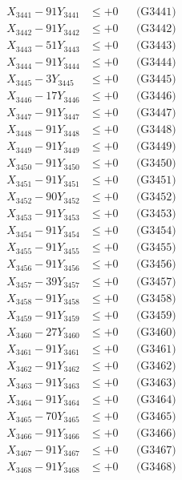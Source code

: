 \documentclass[a4paper,10pt]{article}
\begin{document}
{\begin{align}
\allowbreak
X_{3441} - 91Y_{3441} &\leq +0 && \text{(G3441)} \\
X_{3442} - 91Y_{3442} &\leq +0 && \text{(G3442)} \\
X_{3443} - 51Y_{3443} &\leq +0 && \text{(G3443)} \\
X_{3444} - 91Y_{3444} &\leq +0 && \text{(G3444)} \\
X_{3445} - 3Y_{3445} &\leq +0 && \text{(G3445)} \\
X_{3446} - 17Y_{3446} &\leq +0 && \text{(G3446)} \\
X_{3447} - 91Y_{3447} &\leq +0 && \text{(G3447)} \\
X_{3448} - 91Y_{3448} &\leq +0 && \text{(G3448)} \\
X_{3449} - 91Y_{3449} &\leq +0 && \text{(G3449)} \\
X_{3450} - 91Y_{3450} &\leq +0 && \text{(G3450)} \\
\allowbreak
X_{3451} - 91Y_{3451} &\leq +0 && \text{(G3451)} \\
X_{3452} - 90Y_{3452} &\leq +0 && \text{(G3452)} \\
X_{3453} - 91Y_{3453} &\leq +0 && \text{(G3453)} \\
X_{3454} - 91Y_{3454} &\leq +0 && \text{(G3454)} \\
X_{3455} - 91Y_{3455} &\leq +0 && \text{(G3455)} \\
X_{3456} - 91Y_{3456} &\leq +0 && \text{(G3456)} \\
X_{3457} - 39Y_{3457} &\leq +0 && \text{(G3457)} \\
X_{3458} - 91Y_{3458} &\leq +0 && \text{(G3458)} \\
X_{3459} - 91Y_{3459} &\leq +0 && \text{(G3459)} \\
X_{3460} - 27Y_{3460} &\leq +0 && \text{(G3460)} \\
\allowbreak
X_{3461} - 91Y_{3461} &\leq +0 && \text{(G3461)} \\
X_{3462} - 91Y_{3462} &\leq +0 && \text{(G3462)} \\
X_{3463} - 91Y_{3463} &\leq +0 && \text{(G3463)} \\
X_{3464} - 91Y_{3464} &\leq +0 && \text{(G3464)} \\
X_{3465} - 70Y_{3465} &\leq +0 && \text{(G3465)} \\
X_{3466} - 91Y_{3466} &\leq +0 && \text{(G3466)} \\
X_{3467} - 91Y_{3467} &\leq +0 && \text{(G3467)} \\
X_{3468} - 91Y_{3468} &\leq +0 && \text{(G3468)} \\

\end{align}}
\end{document}

